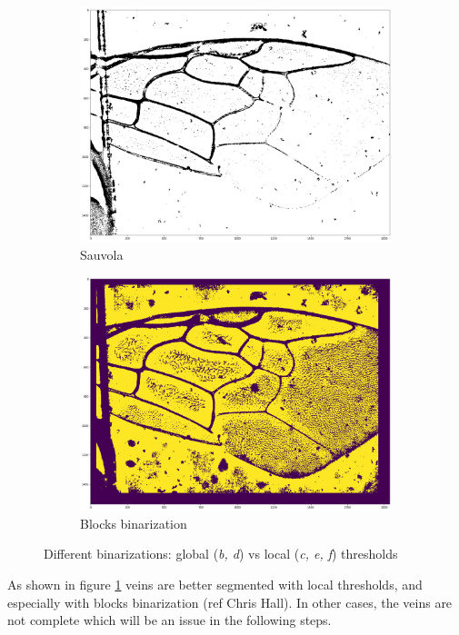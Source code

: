 \documentclass[a4paper]{article}
\begin{document}
\begin{figure}[H]
\begin{subfigure}{.35\textwidth}
  \centering
    \includegraphics[width=\linewidth]{figures/sauvola.png}
    \caption{Sauvola}
\end{subfigure}
\begin{subfigure}{.35\textwidth}
  \centering
    \includegraphics[width=\linewidth]{figures/blocks.png}
    \caption{Blocks binarization}
\end{subfigure}
    \caption{Different binarizations: global (\textit{b, d}) vs local (\textit{c, e, f}) thresholds}
\label{binarizations}
\end{figure}

As shown in figure \ref{binarizations} veins are better segmented with local thresholds, and especially with blocks binarization (ref Chris Hall). In other cases, the veins are not complete which will be an issue in the following steps.
\newpage
\end{document}
